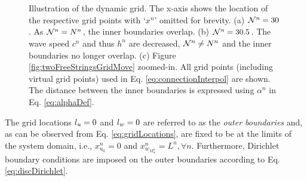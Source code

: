 \documentclass[fleqn]{jaes}
\begin{document}
\begin{figure}[t]
    \centering
    \\
    \vspace{-1em}\\
    \vspace{-1em}
    \vspace{-1em}\caption{Illustration of the dynamic grid. The x-axis shows the location of the respective grid points with `$x^n$' omitted for brevity. 
    (a) $\mathcal{N}^n = 30$. As $\mathcal{N}^n = N^n$, the inner boundaries overlap. (b) $\mathcal{N}^n = 30.5$. The wave speed $c^n$ and thus $h^n$ are decreased, $\mathcal{N}^n \neq N^n$ and the inner boundaries no longer overlap. (c) Figure \ref{fig:twoFreeStringsGridMove} zoomed-in. All grid points (including virtual grid points) used in Eq. \eqref{eq:connectionInterpol} are shown. The distance between the inner boundaries is expressed using $\alpha^n$ in Eq. \eqref{eq:alphaDef}.}
\end{figure}
The grid locations ${l_u} = 0$ and ${l_w} = 0$ are referred to as the \textit{outer boundaries} and, as can be observed from Eq. \eqref{eq:gridLocations}, are fixed to be at the limits of the system domain, i.e., $x_{u_0}^n = 0$ and $x_{w_{M_w^n}}^n = L^n, \forall n$. Furthermore, Dirichlet boundary conditions are imposed on the outer boundaries according to Eq. \eqref{eq:discDirichlet}. 
\end{document}

